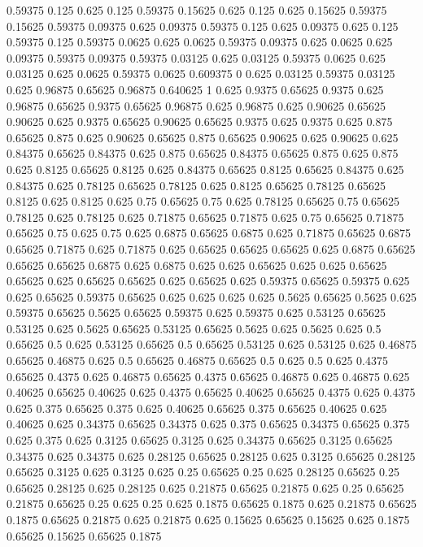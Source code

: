 0.59375 0.125
0.625 0.125
0.59375 0.15625
0.625 0.125
0.625 0.15625
0.59375 0.15625
0.59375 0.09375
0.625 0.09375
0.59375 0.125
0.625 0.09375
0.625 0.125
0.59375 0.125
0.59375 0.0625
0.625 0.0625
0.59375 0.09375
0.625 0.0625
0.625 0.09375
0.59375 0.09375
0.59375 0.03125
0.625 0.03125
0.59375 0.0625
0.625 0.03125
0.625 0.0625
0.59375 0.0625
0.609375 0
0.625 0.03125
0.59375 0.03125
0.625 0.96875
0.65625 0.96875
0.640625 1
0.625 0.9375
0.65625 0.9375
0.625 0.96875
0.65625 0.9375
0.65625 0.96875
0.625 0.96875
0.625 0.90625
0.65625 0.90625
0.625 0.9375
0.65625 0.90625
0.65625 0.9375
0.625 0.9375
0.625 0.875
0.65625 0.875
0.625 0.90625
0.65625 0.875
0.65625 0.90625
0.625 0.90625
0.625 0.84375
0.65625 0.84375
0.625 0.875
0.65625 0.84375
0.65625 0.875
0.625 0.875
0.625 0.8125
0.65625 0.8125
0.625 0.84375
0.65625 0.8125
0.65625 0.84375
0.625 0.84375
0.625 0.78125
0.65625 0.78125
0.625 0.8125
0.65625 0.78125
0.65625 0.8125
0.625 0.8125
0.625 0.75
0.65625 0.75
0.625 0.78125
0.65625 0.75
0.65625 0.78125
0.625 0.78125
0.625 0.71875
0.65625 0.71875
0.625 0.75
0.65625 0.71875
0.65625 0.75
0.625 0.75
0.625 0.6875
0.65625 0.6875
0.625 0.71875
0.65625 0.6875
0.65625 0.71875
0.625 0.71875
0.625 0.65625
0.65625 0.65625
0.625 0.6875
0.65625 0.65625
0.65625 0.6875
0.625 0.6875
0.625 0.625
0.65625 0.625
0.625 0.65625
0.65625 0.625
0.65625 0.65625
0.625 0.65625
0.625 0.59375
0.65625 0.59375
0.625 0.625
0.65625 0.59375
0.65625 0.625
0.625 0.625
0.625 0.5625
0.65625 0.5625
0.625 0.59375
0.65625 0.5625
0.65625 0.59375
0.625 0.59375
0.625 0.53125
0.65625 0.53125
0.625 0.5625
0.65625 0.53125
0.65625 0.5625
0.625 0.5625
0.625 0.5
0.65625 0.5
0.625 0.53125
0.65625 0.5
0.65625 0.53125
0.625 0.53125
0.625 0.46875
0.65625 0.46875
0.625 0.5
0.65625 0.46875
0.65625 0.5
0.625 0.5
0.625 0.4375
0.65625 0.4375
0.625 0.46875
0.65625 0.4375
0.65625 0.46875
0.625 0.46875
0.625 0.40625
0.65625 0.40625
0.625 0.4375
0.65625 0.40625
0.65625 0.4375
0.625 0.4375
0.625 0.375
0.65625 0.375
0.625 0.40625
0.65625 0.375
0.65625 0.40625
0.625 0.40625
0.625 0.34375
0.65625 0.34375
0.625 0.375
0.65625 0.34375
0.65625 0.375
0.625 0.375
0.625 0.3125
0.65625 0.3125
0.625 0.34375
0.65625 0.3125
0.65625 0.34375
0.625 0.34375
0.625 0.28125
0.65625 0.28125
0.625 0.3125
0.65625 0.28125
0.65625 0.3125
0.625 0.3125
0.625 0.25
0.65625 0.25
0.625 0.28125
0.65625 0.25
0.65625 0.28125
0.625 0.28125
0.625 0.21875
0.65625 0.21875
0.625 0.25
0.65625 0.21875
0.65625 0.25
0.625 0.25
0.625 0.1875
0.65625 0.1875
0.625 0.21875
0.65625 0.1875
0.65625 0.21875
0.625 0.21875
0.625 0.15625
0.65625 0.15625
0.625 0.1875
0.65625 0.15625
0.65625 0.1875
